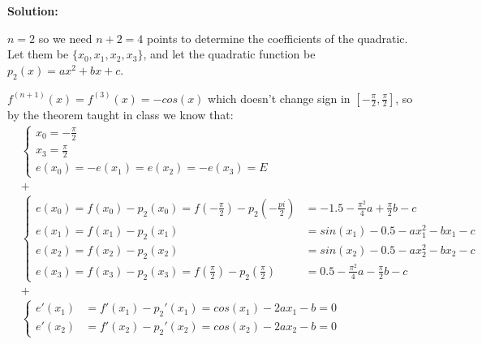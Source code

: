 \documentclass[conference,onecolumn]{IEEEtran}
\begin{document}
\begin{enumerate}[label=\arabic{enumi}.]
\begin{enumerate}
                        \textbf{Solution:}

                        $n = 2$ so we need $n + 2 = 4$ points to determine the coefficients of the quadratic.
                        Let them be $\{x_0, x_1, x_2, x_3\}$, and let the quadratic function be $p_2(x) = a x^2 + b x + c$.

                        $f^{(n + 1)}(x) = f^{(3)}(x) = - cos(x)$ which doesn't change sign in $[-\frac{\pi}{2}, \frac{\pi}{2}]$, so by the theorem taught in class we know that:
                        \begin{align*}
                               & \begin{cases}
                                    x_0 = -\frac{\pi}{2} \\
                                    x_3 = \frac{\pi}{2}  \\
                                    e(x_0) = - e(x_1) = e(x_2) = - e(x_3) = E
                              \end{cases} \\
                               & +                         \\
                               & \begin{cases}
                                    e(x_0) = f(x_0) - p_2(x_0) = f(-\frac{\pi}{2}) - p_2(-\frac{pi}{2}) & = -1.5 - \frac{\pi^2}{4}a + \frac{\pi}{2}b - c \\
                                    e(x_1) = f(x_1) - p_2(x_1)                                          & = sin(x_1) - 0.5 - a x_1^2 - b x_1 - c         \\
                                    e(x_2) = f(x_2) - p_2(x_2)                                          & = sin(x_2) - 0.5 - a x_2^2 - b x_2 - c         \\
                                    e(x_3) = f(x_3) - p_2(x_3) = f(\frac{\pi}{2}) - p_2(\frac{\pi}{2})  & = 0.5 - \frac{\pi^2}{4}a - \frac{\pi}{2}b - c
                              \end{cases} \\
                               & +                         \\
                               & \begin{cases}
                                    e'(x_1) & = f'(x_1) - p_2'(x_1) = cos(x_1) - 2 a x_1 - b = 0 \\
                                    e'(x_2) & = f'(x_2) - p_2'(x_2) = cos(x_2) - 2 a x_2 - b = 0
                              \end{cases} \\

\end{align*}
\end{enumerate}
\end{enumerate}
\end{document}

